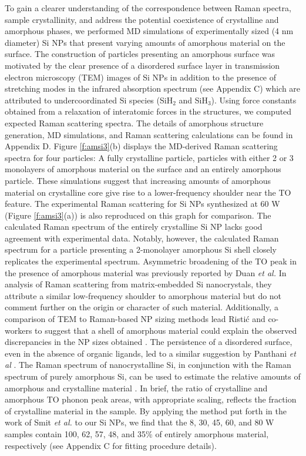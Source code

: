 To gain a clearer understanding of the correspondence between Raman spectra, sample crystallinity, and address the potential coexistence of crystalline and amorphous phases, we performed MD simulations of experimentally sized (4 nm diameter) Si NPs that present varying amounts of amorphous material on the surface. The construction of particles presenting an amorphous surface was motivated by the clear presence of a disordered surface layer in transmission electron microscopy (TEM) images of Si NPs in addition to the presence of stretching modes in the infrared absorption spectrum (see Appendix C) which are attributed to undercoordinated Si species (SiH$_2$ and SiH$_3$). Using force constants obtained from a relaxation of interatomic forces in the structures, we computed expected Raman scattering spectra. The details of amorphous structure generation, MD simulations, and Raman scattering calculations can be found in Appendix D.  Figure \ref{f:amsi3}(b) displays the MD-derived Raman scattering spectra for four particles: A fully crystalline particle, particles with either 2 or 3 monolayers of amorphous material on the surface and an entirely amorphous particle. These simulations suggest that increasing amounts of amorphous material on crystalline core give rise to a lower-frequency shoulder near the TO feature. The experimental Raman scattering for Si NPs synthesized at 60 W (Figure \ref{f:amsi3}(a)) is also reproduced on this graph for comparison. The calculated Raman spectrum of the entirely crystalline Si NP lacks good agreement with experimental data. Notably, however, the calculated Raman spectrum for a particle presenting a 2-monolayer amorphous Si shell closely replicates the experimental spectrum. Asymmetric broadening of the TO peak in the presence of amorphous material was previously reported by Duan \emph{et al.} In analysis of Raman scattering from matrix-embedded Si nanocrystals, they attribute a similar low-frequency shoulder to amorphous material but do not comment further on the origin or character of such material\cite{duan2012raman}. Additionally, a comparison of TEM to Raman-based NP sizing methods lead Ristić and co-workers to suggest that a shell of amorphous material could explain the observed discrepancies in the NP sizes obtained \cite{ristic2009application}. The persistence of a disordered surface, even in the absence of organic ligands, led to a similar suggestion by Panthani \emph{et al} \cite{panthani2012graphene}. The Raman spectrum of nanocrystalline Si, in conjunction with the Raman spectrum of purely amorphous Si, can be used to estimate the relative amounts of amorphous and crystalline material \cite{smit2003determining}. In brief, the ratio of crystalline and amorphous TO phonon peak areas, with appropriate scaling, reflects the fraction of crystalline material in the sample. By applying the method put forth in the work of Smit \emph{et al.} \cite{smit2003determining} to our Si NPs, we find that the 8, 30, 45, 60, and 80 W samples contain 100, 62, 57, 48, and 35\% of entirely amorphous material, respectively (see Appendix C for fitting procedure details). \par 

